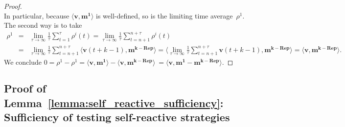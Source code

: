 \documentclass[9pt,twoside,lineno]{pnas-new}
\theoremstyle{plainCl1}
\theoremstyle{plainCl2}
\begin{document}
\begin{proof}
\begin{equation*}
\end{equation*}
In particular, because $\big\langle \mathbf{v},\mathbf{m^1} \big\rangle$ is well-defined, so is the limiting time average~$\rho^1$. The second way is to take
\begin{equation*}
\begin{array}{rcl}
\rho^1 &= &\displaystyle 
\lim_{\tau \to \infty} \frac{1}{\tau} \sum_{t=1}^\tau \rho^i(t) 
= \lim_{\tau \to \infty} \frac{1}{\tau} \sum_{t=n+1}^{n+\tau} \rho^i(t)\\[0.5cm]
&= &\displaystyle 
\lim_{\tau \to \infty} \frac{1}{\tau} \sum_{t=n+1}^{n+\tau}  \big\langle \mathbf{v}(t\!+\!k\!-\!1) ,  \mathbf{m^{k-\text{Rep}}}\big\rangle 
=  \big\langle  \lim_{\tau \to \infty} \frac{1}{\tau} \sum_{t=n+1}^{n+\tau} \mathbf{v}(t\!+\!k\!-\!1) ,  \mathbf{m^{k-\text{Rep}}}\big\rangle
= \big\langle \mathbf{v},  \mathbf{m^{k-\text{Rep}}} \big\rangle.
\end{array}
\end{equation*}
We conclude
$
0 = \rho^1 \!-\! \rho^1 = \big\langle \mathbf{v},\mathbf{m^1} \big\rangle\!-\!\big\langle \mathbf{v},  \mathbf{m^{k-\text{Rep}}} \big\rangle\ = \big\langle \mathbf{v}, \mathbf{m^1}\!-\!\mathbf{m^{k-\text{Rep}}} \big\rangle.
$
\end{proof}





\subsection{Proof of Lemma~\ref{lemma:self_reactive_sufficiency}: Sufficiency of testing self-reactive strategies}
\end{document}

